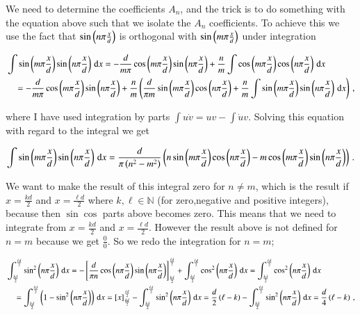 \documentclass[11pt,english,a4paper]{article}
\begin{document}
\begin{flushleft}
We need to determine the coefficients $A_n$, and the trick is to do something with the equation above such that we isolate the $A_n$ coefficients. To achieve this we use the fact that $\sin\left({n\pi\frac{x}{d}}\right)$ is orthogonal with $\sin\left({m\pi\frac{x}{d}}\right)$ under integration 

\begin{align*}
&\int \sin\left({m\pi\frac{x}{d}}\right)\sin\left({n\pi\frac{x}{d}}\right)\,\mathrm{d}x = -\frac{d}{m\pi}\cos\left({m\pi\frac{x}{d}}\right)\sin\left({n\pi\frac{x}{d}}\right) + \frac{n}{m}\int \cos\left({m\pi\frac{x}{d}}\right)\cos\left({n\pi\frac{x}{d}}\right)\,\mathrm{d}x
\\
&\quad = -\frac{d}{m\pi}\cos\left({m\pi\frac{x}{d}}\right)\sin\left({n\pi\frac{x}{d}}\right) + \frac{n}{m}\left({\frac{d}{\pi m} \sin\left({m\pi\frac{x}{d}}\right) \cos\left({n\pi\frac{x}{d}}\right) + \frac{n}{m}\int \sin\left({m\pi\frac{x}{d}}\right)\sin\left({n\pi\frac{x}{d}}\right)\,\mathrm{d}x}\right) \,,
\end{align*}

where I have used integration by parts $\int u\dot{v} = uv - \int \dot{u}v$. Solving this equation with regard to the integral we get

\begin{align*}
\int \sin\left({m\pi\frac{x}{d}}\right)\sin\left({n\pi\frac{x}{d}}\right)\,\mathrm{d}x = \frac{d}{\pi\left({n^2 - m^2}\right)} \left({n \sin\left({m\pi\frac{x}{d}}\right)\cos\left({n\pi\frac{x}{d}}\right) - m \cos\left({m\pi\frac{x}{d}}\right)\sin\left({n\pi\frac{x}{d}}\right)}\right) \,.
\end{align*}

We want to make the result of this integral zero for $n\neq m$, which is the result if $x=\frac{k d}{2}$ and $x=\frac{\ell d}{2}$ where $k,\ell\in\mathbb{N}$ (for zero,negative and positive integers), because then $\sin\cos$ parts above becomes zero. This means that we need to integrate from $x=\frac{k d}{2}$ and $x=\frac{\ell d}{2}$. However the result above is not defined for $n=m$ because we get $\frac{0}{0}$. So we redo the integration for $n=m$;

\begin{align*}
&\int_{\frac{k d}{2}}^{\frac{\ell d}{2}} \sin^2\left({n\pi\frac{x}{d}}\right)\,\mathrm{d}x 
= -\left[{ \frac{d}{\pi n}\cos\left({n\pi\frac{x}{d}}\right)\sin\left({n\pi\frac{x}{d}}\right)}\right]_{\frac{k d}{2}}^{\frac{\ell d}{2}} + \int_{\frac{k d}{2}}^{\frac{\ell d}{2}} \cos^2\left({n\pi\frac{x}{d}}\right)\,\mathrm{d}x
= \int_{\frac{k d}{2}}^{\frac{\ell d}{2}}  \cos^2\left({n\pi\frac{x}{d}}\right)\,\mathrm{d}x
\\ 
&\quad = \int_{\frac{k d}{2}}^{\frac{\ell d}{2}}  \left({1-\sin^2\left({n\pi\frac{x}{d}}\right)}\right)\,\mathrm{d}x 
= \left[{x}\right]_{\frac{k d}{2}}^{\frac{\ell d}{2}} - \int_{\frac{k d}{2}}^{\frac{\ell d}{2}}  \sin^2\left({n\pi\frac{x}{d}}\right)\,\mathrm{d}x 
= \frac{d}{2}\left({\ell-k}\right) - \int_{\frac{k d}{2}}^{\frac{\ell d}{2}}  \sin^2\left({n\pi\frac{x}{d}}\right)\,\mathrm{d}x 
= \frac{d}{4}\left({\ell-k}\right) \,,
\end{align*}


\end{flushleft}
\end{document}
